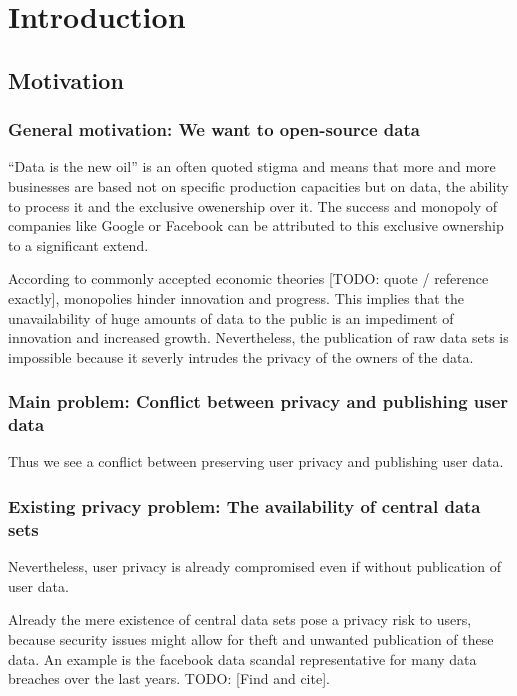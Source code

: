 
\chapter{Introduction}\label{chapter:introduction}
\section{Motivation}
\subsection{General motivation: We want to open-source data} \label{general-motivation}

“Data is the new oil” is an often quoted stigma and means that more and more businesses are
based not on specific production capacities but on data, the ability to process it and the exclusive owenership over it. The success and monopoly of
companies like Google or Facebook can be attributed to this exclusive ownership to a significant extend.

According to commonly accepted economic theories [TODO: quote / reference exactly], monopolies hinder innovation and
progress. This implies that the unavailability of huge amounts of data to the public is an
impediment of innovation and increased growth.
Nevertheless, the publication of raw data sets is impossible because it severly intrudes the privacy of the owners of the data.

\subsection{Main problem: Conflict between privacy and publishing user data}
Thus we see a conflict between preserving user privacy and publishing user data.
\subsection{Existing privacy problem: The availability of central data sets}
Nevertheless, user privacy is already compromised even if without publication of user data.

Already the mere existence of central data sets pose a privacy risk to users, because security issues might allow for theft and unwanted publication of these data.
An example is the facebook data scandal representative for many data breaches over the last years. TODO: [Find and cite].


